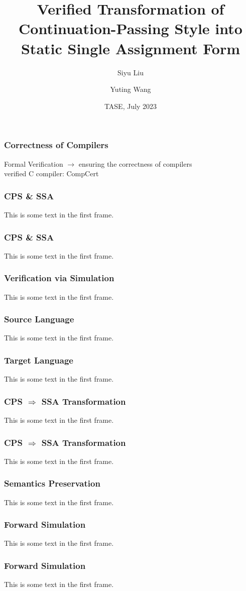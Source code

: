 \documentclass{beamer}
\title{Verified Transformation of Continuation-Passing Style into Static Single Assignment Form}
\author{Siyu Liu \and Yuting Wang}
\institute{Shanghai Jiao Tong University}
\date{TASE, July 2023}
\begin{document}
\frame{\titlepage}

\begin{frame}
\frametitle{Correctness of Compilers}
Formal Verification $\rightarrow$  ensuring the correctness of compilers \\
verified C compiler: CompCert \\


\end{frame}

\begin{frame}
\frametitle{CPS \& SSA}
This is some text in the first frame.
\end{frame}

\begin{frame}
\frametitle{CPS \& SSA}
This is some text in the first frame.
\end{frame}

\begin{frame}
\frametitle{Verification via Simulation}
This is some text in the first frame.
\end{frame}

\begin{frame}
\frametitle{Source Language}
This is some text in the first frame.
\end{frame}

\begin{frame}
\frametitle{Target Language}
This is some text in the first frame.
\end{frame}

\begin{frame}
\frametitle{CPS $\Rightarrow$ SSA Transformation}
This is some text in the first frame.
\end{frame}

\begin{frame}
\frametitle{CPS $\Rightarrow$ SSA Transformation}
This is some text in the first frame.
\end{frame}

\begin{frame}
\frametitle{Semantics Preservation}
This is some text in the first frame.
\end{frame}

\begin{frame}
\frametitle{Forward Simulation}
This is some text in the first frame.
\end{frame}

\begin{frame}
\frametitle{Forward Simulation}
This is some text in the first frame.
\end{frame}
\end{document}
